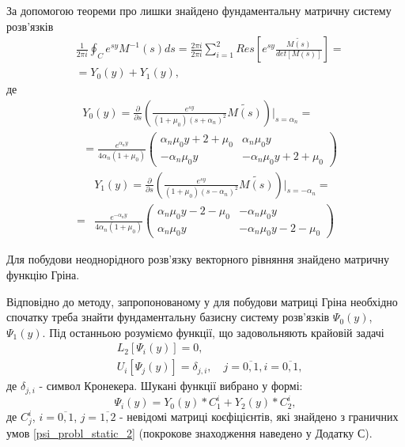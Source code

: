 За допомогою теореми про лишки знайдено фундаментальну матричну систему розв'язків
\begin{align*}
    &\frac{1}{2\pi i} \oint_C e^{sy} M^{-1}(s)ds = \frac{2 \pi i}{2 \pi i} \sum_{i=1}^{2} Res\left[ e^{sy} \frac{\widetilde{M(s)}}{det[M(s)]} \right] = \\
    & =Y_0(y) + Y_1(y),
\end{align*}
де
\begin{align}
    &Y_0(y) =  \frac{\partial}{\partial s} \left( \frac{e^{sy}}{(1 + \mu_0)(s+\alpha_n)^2} \widetilde{M(s)} \right) \Big|_{s=\alpha_n} = \nonumber \\
    &=\frac{e^{\alpha_n y}}{4\alpha_n(1 + \mu_0)} \begin{pmatrix}
    \alpha_n \mu_0 y + 2 + \mu_0 & \alpha_n \mu_0 y \\
    -\alpha_n \mu_0 y & -\alpha_n \mu_0 y + 2 + \mu_0
    \end{pmatrix}
\end{align}
\begin{align}
    &Y_1(y) = \frac{\partial}{\partial s} \left(\frac{e^{sy}}{(1 + \mu_0)(s-\alpha_n)^2} \widetilde{M(s)} \right) \Big|_{s=-\alpha_n} = \nonumber \\
    =&\frac{e^{-\alpha_n y}}{4\alpha_n(1 + \mu_0)} \begin{pmatrix}
    \alpha_n \mu_0 y - 2 - \mu_0 & -\alpha_n \mu_0 y \\
    \alpha_n \mu_0 y & -\alpha_n \mu_0 y - 2 - \mu_0
    \end{pmatrix}
\end{align}

Для побудови неоднорідного розв'язку векторного рівняння знайдено матричну функцію Гріна.

Відповідно до методу, запропонованому у \cite{popov_2} для побудови матриці Гріна необхідно спочатку треба знайти фундаментальну базисну систему розв'язків $\Psi_0(y)$, $\Psi_1(y)$.
Під останньою розуміємо функції, що задовольняють крайовій задачі
\begin{align}\label{psi_probl_static_2}
    &L_2\left[ \Psi_i(y) \right] = 0, \nonumber \\
    &U_i\left[ \Psi_j(y) \right] = \delta_{j,i}, \quad j= \overline{0, 1}, i= \overline{0, 1},
\end{align}
де $\delta_{j,i}$ - символ Кронекера.
Шукані функції вибрано у формі:
\begin{equation}\label{psi_static_2}
    \Psi_i(y) = Y_0(y) * C_1^i + Y_2(y) * C_2^i,
\end{equation}
де $C_j^i$, $i=\overline{0, 1}$, $j=\overline{1, 2}$ - невідомі матриці коєфіцієнтів, які знайдено з граничних умов \eqref{psi_probl_static_2}
(покрокове знаходження наведено у Додатку С).

